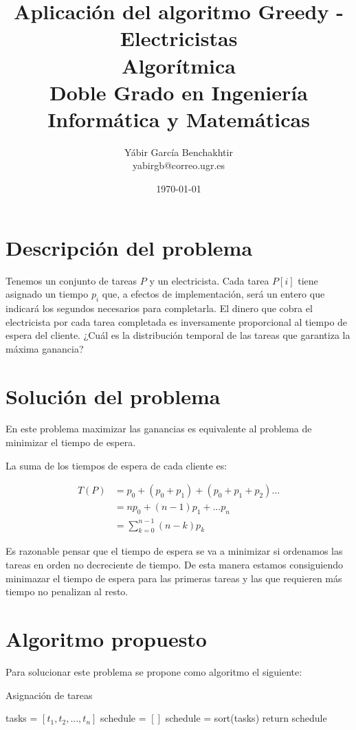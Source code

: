 \documentclass{article}
\title{Aplicación del algoritmo Greedy - Electricistas \\[5mm]
  \Large Algorítmica\\
  \normalsize Doble Grado en Ingeniería Informática y Matemáticas\\[5cm]
}
\author{Yábir García Benchakhtir \\ yabirgb@correo.ugr.es \\[10cm]}
\date{\today}
\begin{document}
\maketitle

\newpage
\tableofcontents
\newpage
\section{Descripción del problema}

Tenemos un conjunto de tareas $P$ y un electricista. Cada tarea $P[i]$
tiene asignado un tiempo $p_i$ que, a efectos de implementación, será
un entero que indicará los segundos necesarios para completarla. El
dinero que cobra el electricista por cada tarea completada es
inversamente proporcional al tiempo de espera del cliente. ¿Cuál es la
distribución temporal de las tareas que garantiza la máxima ganancia?

\section{Solución del problema}

En este problema maximizar las ganancias es equivalente al problema de
minimizar el tiempo de espera.

La suma de los tiempos de espera de cada cliente es:

\begin{align}
  T(P) &= p_0 + (p_0 + p_1) + (p_0+ p_1 + p_2)  \dots \\
       &= np_0 + (n-1)p_1 + \dots p_n \\
       &= \sum_{k=0}^{n-1}(n-k)p_k
\end{align}
  

Es razonable pensar que el tiempo de espera se va a minimizar si
ordenamos las tareas en orden no decreciente de tiempo. De esta manera
estamos consiguiendo minimazar el tiempo de espera para las primeras
tareas y las que requieren más tiempo no penalizan al resto.

\section{Algoritmo propuesto}

Para solucionar este problema se propone como algoritmo el siguiente:

\begin{algorithm}[H]
\caption{Asignación de tareas}
\begin{algorithmic}
\State tasks = $[t_1, t_2, ... ,t_n]$
\State schedule = $[]$
\State schedule = sort(tasks)
\State return schedule
\EndProcedure
\end{algorithmic}
\end{algorithm}
\end{document}
